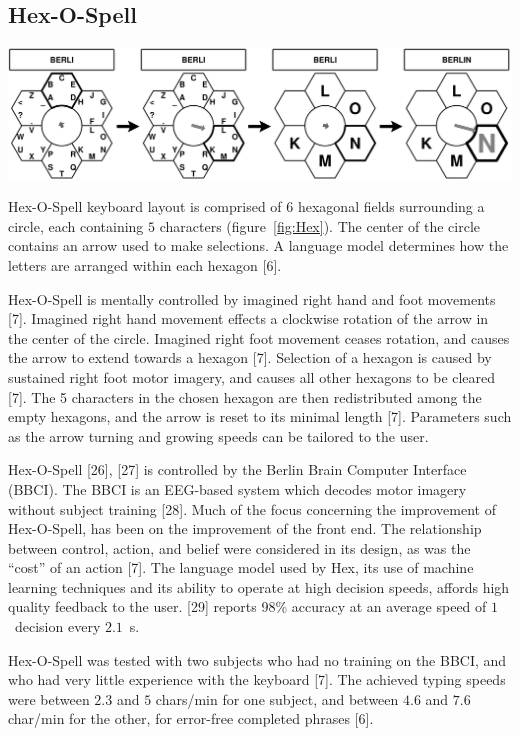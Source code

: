 \documentclass[12pt,titlepage]{article}
\begin{document}
\subsection{Hex-O-Spell}

\begin{center}
	\includegraphics[scale=0.40]{figure3.jpeg}
	\label{fig:Hex}
\end{center}


Hex-O-Spell keyboard layout is comprised of $6$ hexagonal fields surrounding a circle, each containing 
$5$ characters (figure~\ref{fig:Hex}).  The center of the circle contains an arrow used to make selections.  A language 
model determines how the letters are arranged within each hexagon [6].

Hex-O-Spell is mentally controlled by imagined right hand and foot movements [7].  Imagined right 
hand movement effects a clockwise rotation of the arrow in the center of the circle.  Imagined right foot 
movement ceases rotation, and causes the arrow to extend towards a hexagon [7].  Selection of a 
hexagon is caused by sustained right foot motor imagery, and causes all other hexagons to be 
cleared [7].  The 5 characters in the chosen hexagon are then redistributed among the empty hexagons, 
and the arrow is reset to its minimal length [7].  Parameters such as the arrow turning and growing 
speeds can be tailored to the user.

Hex-O-Spell [26], [27] is controlled by the Berlin Brain Computer Interface (BBCI).  The BBCI is an EEG-based
system which decodes motor imagery without subject training [28].  Much of the  focus 
concerning the improvement of Hex-O-Spell, has been on the improvement of the front end.  The 
relationship between control, action, and belief were considered in its design, as was the ``cost'' of an 
action [7].  The language model used by Hex,  its use of machine learning techniques and its ability to 
operate at high decision speeds, affords high quality feedback to the user. [29] reports 98\% accuracy at 
an average speed of $1$~decision every  $2.1$~s.

Hex-O-Spell was tested with two subjects who had no training on the BBCI, and who had very little 
experience with the keyboard [7].  The achieved typing speeds were between $2.3$ and $5$ chars/min for 
one subject, and between $4.6$ and $7.6$ char/min for the other, for error-free completed phrases [6].
\end{document}
